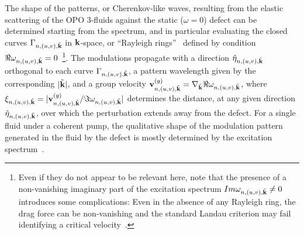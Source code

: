 The shape of the patterns, or Cherenkov-like waves, resulting from the
elastic scattering of the OPO 3-fluids against the static ($\omega=0$)
defect can be determined starting from the spectrum, and in particular
evaluating the closed curves $\Gamma_{n,(u,v), \tilde{{\mathbf k}}}$ in
${\mathbf k}$-space, or ``Rayleigh rings''~\cite{9783319002651} defined
by condition $\Re \omega_{n,(u,v), \tilde{{\mathbf k}}} =
0$~\footnote{Even if they do not appear to be relevant here, note that
  the presence of a non-vanishing imaginary part of the excitation
  spectrum $Im\omega_{n,(u,v),\tilde{{\mathbf k}}}\neq 0$ introduces some
  complications: Even in the absence of any Rayleigh ring, the drag
  force can be non-vanishing and the standard Landau criterion may
  fail identifying a critical velocity~\cite{Wouters_2010}.}.
%
The modulations propagate with a direction
$\hat{\eta}_{n,(u,v),\tilde{{\mathbf k}}}$ orthogonal to each curve
$\Gamma_{n,(u,v), \tilde{{\mathbf k}}}$, a pattern wavelength given by
the corresponding $|\tilde{{\mathbf k}}|$, and a group velocity
${\mathbf v}_{n,(u,v),\tilde{{\mathbf k}}}^{(g)}=\nabla_{\tilde{{\mathbf k}}}
\Re \omega_{n,(u,v), \tilde{{\mathbf k}}}$, where
$\xi_{n,(u,v),\tilde{{\mathbf k}}} =
|{\mathbf v}_{n,(u,v),\tilde{{\mathbf k}}}^{(g)} / \Im \omega_{n,(u,v),
  \tilde{{\mathbf k}}}|$ determines the distance, at any given direction
$\hat{\eta}_{n,(u,v),\tilde{{\mathbf k}}}$, over which the perturbation
extends away from the defect. For a single fluid under a coherent
pump, the qualitative shape of the modulation pattern generated in the
fluid by the defect is mostly determined by the excitation
spectrum~\cite{Carusotto_2006,Carusotto_2004}.

